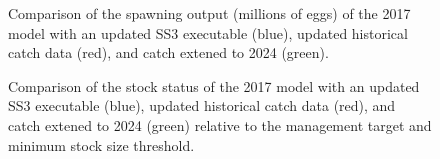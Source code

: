 \documentclass[
]{scrartcl}
\begin{document}
\begin{figure}


\caption{\label{fig-bridge3-comp2}Comparison of the spawning output
(millions of eggs) of the 2017 model with an updated SS3 executable
(blue), updated historical catch data (red), and catch extened to 2024
(green).}

\end{figure}%

\begin{figure}


\caption{\label{fig-bridge3-comp4}Comparison of the stock status of the
2017 model with an updated SS3 executable (blue), updated historical
catch data (red), and catch extened to 2024 (green) relative to the
management target and minimum stock size threshold.}

\end{figure}%
\end{document}
